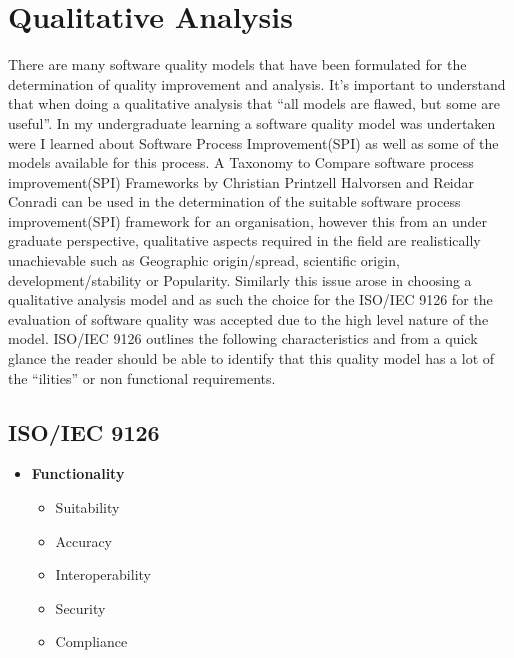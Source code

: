 \section{Qualitative Analysis}

	\normalsize
	{
		There are many software quality models that have been formulated for the determination of quality improvement and analysis.  
		It's important to understand that when doing a qualitative analysis that ``all models are flawed, but some are useful''.
		In my undergraduate learning a software quality model was undertaken were I learned about Software Process Improvement(SPI)
		as well as some of the models available for this process.  
		\newline
		\newline
		A Taxonomy to Compare software process improvement(SPI) Frameworks by Christian Printzell Halvorsen and Reidar Conradi can be used in the 
		determination of the suitable software process improvement(SPI) framework for an organisation, however this from 
		an under graduate perspective, qualitative aspects required in the field are realistically unachievable 
		such as Geographic origin/spread, scientific origin, development/stability or Popularity.  
		\newline
		\newline
		Similarly this issue arose in choosing a qualitative analysis model and as such the choice for the ISO/IEC 9126
		for the evaluation of software quality was accepted due to the high level nature of the model.
		\newline
		\newline
		ISO/IEC 9126 outlines the following characteristics and from a quick glance the reader should be able to identify that this quality
		model has a lot of the ``ilities'' or non functional requirements.
		\newline
		
		\subsection{ISO/IEC 9126}
		
			\vspace{-5mm}
			\begin{multicols}{3}
		
				\begin{itemize}
					\item \textbf{Functionality}
						\begin{itemize}
							\item Suitability
							\item Accuracy
							\item Interoperability 
							\item Security
							\item Compliance
						\end{itemize}
						

\end{itemize}
\end{multicols}}
